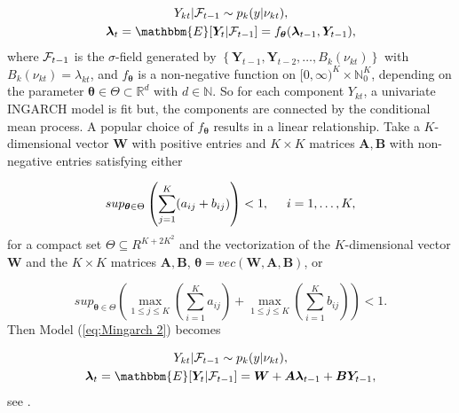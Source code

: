 \begin{equation}
\begin{gathered}
Y_{kt} | \SigA_{t-1} \sim p_k(y|\nu_{kt}), \\
\bm{\lambda}_t = \mathbbm{E}[\bm{Y}_t | \SigA_{t-1}] = f_{\bm{\theta}}(\bm{\lambda}_{t-1},\bm{Y}_{t-1}),
\label{eq:Mingarch 2}
\end{gathered}
\end{equation}
%
where $\mathcal{F}_{t-1}$ is the $\sigma$-field generated by $\left\{\bm{Y}_{t-1},\bm{Y}_{t-2},\ldots,B_k(\nu_{kt})\right\}$ with $B_k(\nu_{kt})=\lambda_{kt}$, and $f_{\bm{\theta}}$ is a non-negative function on $[0,\infty)^K \times \mathbb{N}_0^K$, depending on the parameter $\bm{\theta} \in \Theta \subset \mathbb{R}^d$ with $d \in \mathbb{N}$. So for each component $Y_{kt}$, a univariate INGARCH model is fit but, the components are connected by the conditional mean process. A popular choice of $f_{\bm{\theta}}$ results in a linear relationship. Take a $K$-dimensional vector $\bm{W}$ with positive entries and $K\times K$ matrices $\bm{A},\bm{B}$ with non-negative entries satisfying either

\begin{equation}
sup_{\bm{\theta} \in \Theta} \left(\sum_{j=1}^K(a_{ij}+b_{ij})\right) < 1, \hspace{0.5cm} i=1,\ldots,K , 
\label{eq:Mingarch 2 function condition 1}
\end{equation}
%
for a compact set $\Theta \subseteq R^{K+ 2K^2}$ and the vectorization of the $K$-dimensional vector $\bm{W}$ and the $K\times K$ matrices $\bm{A},\bm{B}$, $\bm{\theta}=vec(\bm{W},\bm{A},\bm{B})$, or 

\begin{equation}
sup_{\bm{\theta} \in \Theta}\left(\max_{1\leq j \leq K}(\sum_{i=1}^K a_{ij}) + \max_{1\leq j \leq K} \left(\sum_{i=1}^K b_{ij}\right)\right) < 1.
\label{eq:Mingarch 2 function condition 2}
\end{equation}
%
Then Model (\ref{eq:Mingarch 2}) becomes 

\begin{equation}
\begin{gathered}
Y_{kt} | \SigA_{t-1} \sim p_k(y|\nu_{kt}), \\
\bm{\lambda}_t = \mathbbm{E}[\bm{Y}_t | \SigA_{t-1}] = \bm{W} + \bm{A}\bm{\lambda}_{t-1} + \bm{B}\bm{Y}_{t-1},
\label{eq:Mingarch 2 linear}
\end{gathered}
\end{equation}
%
see \textcite{Lee:2023}. 
